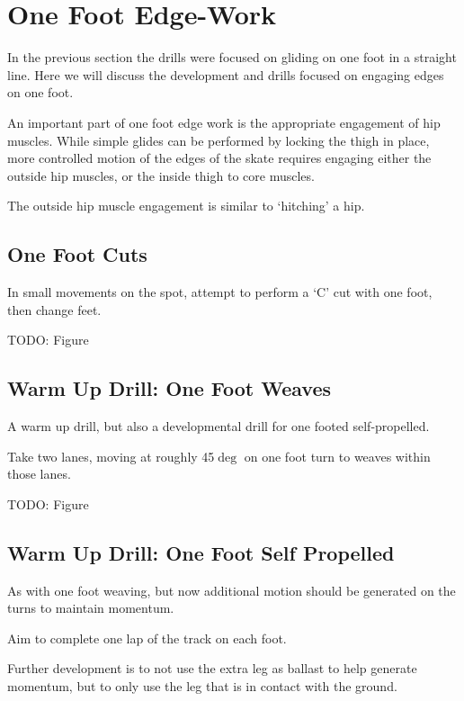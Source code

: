 \section*{One Foot Edge-Work}

In the previous section the drills were focused on gliding on one foot in a straight line.  
Here we will discuss the development and drills focused on engaging edges on one foot. 

An important part of one foot edge work is the appropriate engagement of hip muscles.
While simple glides can be performed by locking the thigh in place, more controlled motion of the edges of the skate requires engaging either the outside hip muscles, or the inside thigh to core muscles.

The outside hip muscle engagement is similar to `hitching' a hip.




\subsection*{One Foot Cuts}

In small movements on the spot, attempt to perform a `C' cut with one foot, then change feet. 

{\color{red} TODO: Figure}




\subsection*{Warm Up Drill: One Foot Weaves} 

A warm up drill, but also a developmental drill for one footed self-propelled.

Take two lanes, moving at roughly 45$\deg$ on one foot turn to weaves within those lanes.    

{\color{red} TODO: Figure}




\subsection*{Warm Up Drill: One Foot Self Propelled} 

As with one foot weaving, but now additional motion should be generated on the turns to maintain momentum.  

Aim to complete one lap of the track on each foot.

Further development is to not use the extra leg as ballast to help generate momentum, but to only use the leg that is in contact with the ground. 





